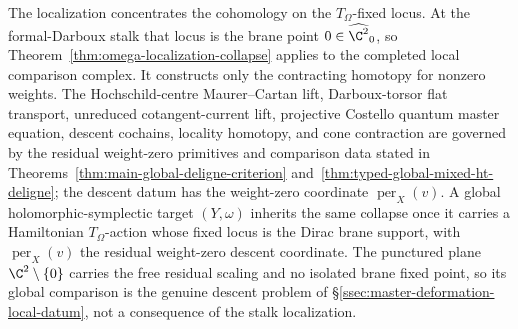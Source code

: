 \begin{rmk}\label{rmk:omega-fixed-locus}
The localization concentrates the cohomology on the \(T_\Omega\)-fixed
locus.  At the formal-Darboux stalk that locus is the brane point
\(0\in\widehat{\C^2}_0\), so Theorem~\ref{thm:omega-localization-collapse}
applies to the completed local comparison complex.  It constructs only
the contracting homotopy for nonzero weights.  The Hochschild-centre
Maurer--Cartan lift, Darboux-torsor flat transport, unreduced
cotangent-current lift, projective Costello quantum master equation,
descent cochains, locality homotopy, and cone contraction are governed by
the residual weight-zero primitives and comparison data stated in
Theorems~\ref{thm:main-global-deligne-criterion}
and~\ref{thm:typed-global-mixed-ht-deligne}; the descent datum has
the weight-zero coordinate \(\operatorname{per}_X(v)\).  A global
holomorphic-symplectic target \((Y,\omega)\) inherits the same collapse
once it carries a Hamiltonian \(T_\Omega\)-action whose fixed locus is
the Dirac brane support, with \(\operatorname{per}_X(v)\) the residual
weight-zero descent coordinate.  The punctured plane
\(\C^2\setminus\{0\}\) carries the free residual scaling and no isolated
brane fixed point, so its global comparison is the genuine descent
problem of \S\ref{ssec:master-deformation-local-datum}, not a
consequence of the stalk localization.
\end{rmk}

